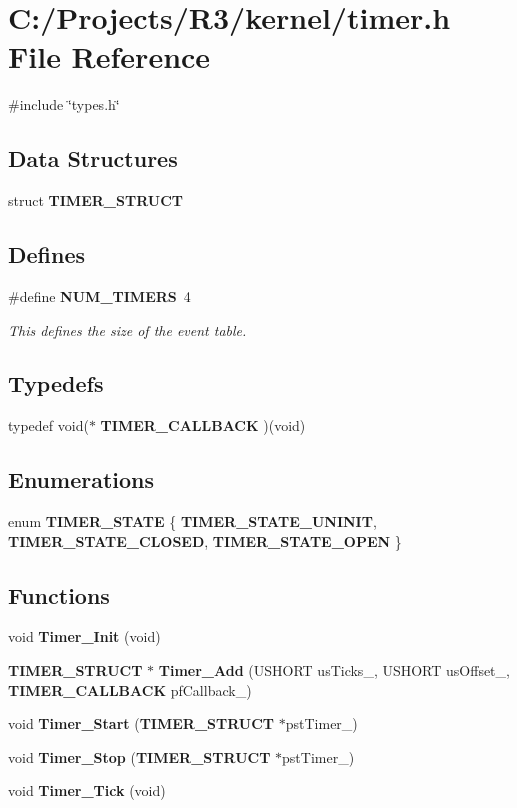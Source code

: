 \section{C:/Projects/R3/kernel/timer.h File Reference}
\label{timer_8h}
{\ttfamily \#include \char`\"{}types.h\char`\"{}}\par
\subsection*{Data Structures}
\begin{DoxyCompactItemize}
\item 
struct {\bf TIMER\_\-STRUCT}
\end{DoxyCompactItemize}
\subsection*{Defines}
\begin{DoxyCompactItemize}
\item 
\#define {\bf NUM\_\-TIMERS}~4
\begin{DoxyCompactList}\small\item\em This defines the size of the event table. \item\end{DoxyCompactList}\end{DoxyCompactItemize}
\subsection*{Typedefs}
\begin{DoxyCompactItemize}
\item 
typedef void($\ast$ {\bf TIMER\_\-CALLBACK} )(void)
\end{DoxyCompactItemize}
\subsection*{Enumerations}
\begin{DoxyCompactItemize}
\item 
enum {\bf TIMER\_\-STATE} \{ {\bf TIMER\_\-STATE\_\-UNINIT}, 
{\bf TIMER\_\-STATE\_\-CLOSED}, 
{\bf TIMER\_\-STATE\_\-OPEN}
 \}
\end{DoxyCompactItemize}
\subsection*{Functions}
\begin{DoxyCompactItemize}
\item 
void {\bf Timer\_\-Init} (void)
\item 
{\bf TIMER\_\-STRUCT} $\ast$ {\bf Timer\_\-Add} (USHORT usTicks\_\-, USHORT usOffset\_\-, {\bf TIMER\_\-CALLBACK} pfCallback\_\-)
\item 
void {\bf Timer\_\-Start} ({\bf TIMER\_\-STRUCT} $\ast$pstTimer\_\-)
\item 
void {\bf Timer\_\-Stop} ({\bf TIMER\_\-STRUCT} $\ast$pstTimer\_\-)
\item 
void {\bf Timer\_\-Tick} (void)
\end{DoxyCompactItemize}


